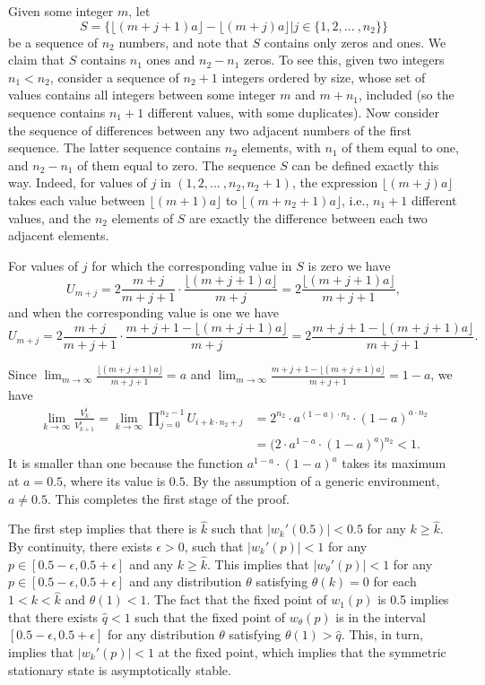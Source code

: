 \documentclass[12pt]{article}
\numberwithin{equation}{section}
\numberwithin{figure}{section}
\theoremstyle{definition}
\theoremstyle{plain}
\theoremstyle{plain}
\theoremstyle{plain}
\theoremstyle{remark}
\theoremstyle{plain}
\theoremstyle{plain}
\begin{document}
Given some integer $m$, let $$S=\bigg\{\lfloor(m+j+1)a\rfloor-\lfloor(m+j)a\rfloor\bigg|j\in \{1,2,...\ ,n_2\}\bigg\}$$ 
be a sequence of $n_2$ numbers, and note that $S$ contains only zeros and ones. We claim that $S$ contains $n_1$ ones and $n_2-n_1$ zeros. To see this, 
 given two integers $n_1<n_2$, consider a sequence of $n_2+1$ integers ordered by size, whose set of values contains all integers between some integer $m$ and $m+n_1$, included (so the sequence contains $n_1+1$ different values, with some duplicates). 
Now consider the sequence of differences between any two adjacent numbers of the first sequence.
The latter sequence contains $n_2$ elements, with $n_1$ of them equal to one, and $n_2-n_1$ of them equal to zero. The sequence $S$ can be defined exactly this way. Indeed, for values of $j$ in $(1,2,...\ ,n_2,n_2+1)$, the expression $\lfloor(m+j)a\rfloor$ takes each value between $\lfloor(m+1)a\rfloor$ to $\lfloor(m+n_2+1)a\rfloor$, i.e., $n_1+1$ different values, and the $n_2$ elements of $S$ are exactly the difference between each two adjacent elements. 

For values of $j$ for which the corresponding value in $S$ is zero we have
\[
U_{m+j}=2\frac{m+j}{m+j+1}\cdot \frac{\lfloor(m+j+1)a\rfloor}{m+j}=2\frac{\lfloor(m+j+1)a\rfloor}{m+j+1},
\]
and when the corresponding value is one we have
\[
U_{m+j}=2\frac{m+j}{m+j+1}\cdot \frac{m+j+1-\lfloor(m+j+1)a\rfloor}{m+j}=2\frac{m+j+1-\lfloor(m+j+1)a\rfloor}{m+j+1}.
\]

Since $\lim_{m\rightarrow\infty}\frac{\lfloor(m+j+1)a\rfloor}{m+j+1}=a$ and $\lim_{m\rightarrow\infty}\frac{m+j+1-\lfloor(m+j+1)a\rfloor}{m+j+1}=1-a$, we have 
\begin{align*}
\lim_{k\rightarrow\infty}\frac{V^i_k}{V^i_{k+1}}=\lim_{k\rightarrow \infty}\prod_{j=0}^{n_2-1}U_{i+k\cdot n_2+j}&=2^{n_2}\cdot a^{(1-a)\cdot n_2}\cdot (1-a)^{a\cdot {n_2}}\\
&=\bigg(2\cdot a^{1-a}\cdot (1-a)^{a}\bigg)^{n_2}<1.
\end{align*}
It is smaller than one because the function $a^{1-a}\cdot (1-a)^{a}$ takes its maximum at $a=0.5$, where its value is $0.5$. By the assumption of a generic environment, $a\neq 0.5$. This completes the first stage of the proof.

The first step implies that there is $\hat{k}$ such that $|w_{k}'(0.5)|<0.5$ for any $k\geq\hat{k}$. By continuity, there exists $\epsilon>0$, such that $|w_{k}'(p)|<1$ for any $p\in\left[0.5-\epsilon,0.5+\epsilon\right]$
and any $k\geq\hat{k}$. This implies that $|{w_{\theta}}'(p)|<1$
for any $p\in\left[0.5-\epsilon,0.5+\epsilon\right]$ and any distribution
$\theta$ satisfying $\theta(k)=0$ for each $1<k<\hat{k}$ and $\theta\left(1\right)<1$.
The fact that the fixed point of $w_{1}(p)$ is 0.5 implies that
there exists $\hat{q}<1$ such that the fixed point of $w_{\theta}(p)$
is in the interval $\left[0.5-\epsilon,0.5+\epsilon\right]$ for any
distribution $\theta$ satisfying $\theta\left(1\right)>\hat{q}$.
This, in turn, implies that $|w_{k}'(p)|<1$ at the fixed point,
which implies that the symmetric stationary state is asymptotically stable.
\end{document}
